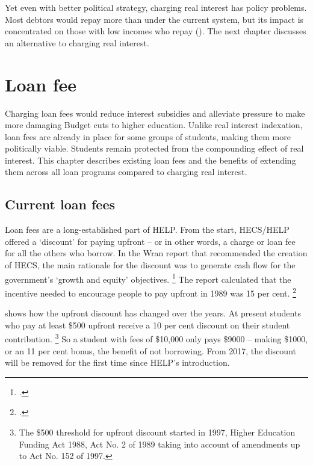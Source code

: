 \documentclass[embargoed]{grattan}
\begin{document}
Yet even with better political strategy, charging real interest has policy problems.
Most debtors would repay more than under the current system, but its impact is concentrated on those with low incomes who repay ().
The next chapter discusses an alternative to charging real interest.

\chapter{Loan fee}\label{chap:6-loan-fee}

Charging loan fees would reduce interest subsidies and alleviate pressure to make more damaging Budget cuts to higher education.
Unlike real interest indexation, loan fees are already in place for some groups of students, making them more politically viable.
Students remain protected from the compounding effect of real interest.
This chapter describes existing loan fees and the benefits of extending them across all loan programs compared to charging real interest.

\section{Current loan fees}\label{sec:current-loan-fees}

Loan fees are a long-established part of \gls{HELP}.
From the start, \gls{HECS}/\gls{HELP} offered a `discount' for paying upfront -- or in other words, a charge or loan fee for all the others who borrow.
In the Wran report that recommended the creation of \gls{HECS}, the main rationale for the discount was to generate cash flow for the government's `growth and equity' objectives.%
\footcite[][79]{Wran1988ReportCommitteeHigher} %
The report calculated that the incentive needed to encourage people to pay upfront in 1989 was 15 per cent.%
\footcite[][93--94]{Wran1988ReportCommitteeHigher} 

 shows how the upfront discount has changed over the years.
At present students who pay at least \$500 upfront receive a 10 per cent discount on their student contribution.%
\footnote{The \$500 threshold for upfront discount started in 1997, Higher Education Funding Act 1988, Act No. 2 of 1989 taking into account of amendments up to Act No. 152 of 1997.} So a student with fees of \$10,000 only pays \$9000 -- making \$1000, or an 11 per cent bonus, the benefit of not borrowing.
From 2017, the discount will be removed for the first time since \gls{HELP}'s introduction.
\end{document}
